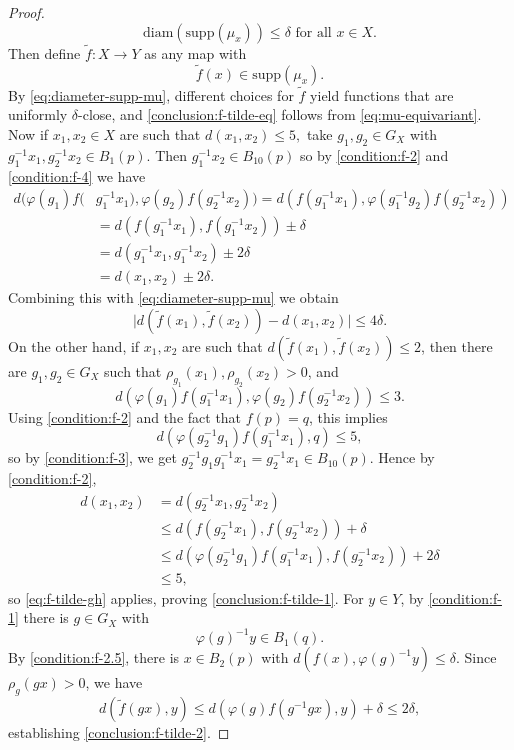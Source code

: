 \documentclass[12pt]{amsart}
\theoremstyle{definition}
\numberwithin{equation}{section}
\newcommand{\diam}{{\text {diam}}}
\newcommand{\supp}{{\text {supp}}}
\begin{document}
\begin{proof}
\begin{equation}
    \diam ( \supp (\mu _x )) \leq \delta \text{ for all }x \in X.    
    \end{equation}
    Then define $\tilde {f} : X \to Y$ as any map with
    \begin{equation}\label{eq:f-tilde-def}
    \tilde{f} (x) \in \supp (\mu _x ).  
    \end{equation}
    By \eqref{eq:diameter-supp-mu},  different choices for $\tilde{f}$ yield functions that are uniformly $\delta $-close, and \eqref{conclusion:f-tilde-eq} follows from  \eqref{eq:mu-equivariant}. Now if $x_1, x_2 \in X$ are such that  $ d( x_1, x_2 ) \leq 5,$ take  $g_1, g_2 \in G_X$ with $g^{-1}_1x_1 , g^{-1}_2x_2 \in B_1(p)$. Then $g_1^{-1} x_2 \in B_{10} (p)$ so by  \eqref{condition:f-2} and \eqref{condition:f-4} we have  
    \begin{align*}
     d( \varphi (g_1) f(&g_1^{-1} x_1) , \varphi (g_2) f(g_2^{-1}x_2)  )   =  d(   f ( g_1 ^{-1} x_1  ) , \varphi ( g_1 ^{-1}g_2  ) f(  g_2 ^{-1} x_2 )   )\\
    & =  d (  f ( g_1 ^{-1} x_1 ) , f (  g_1 ^{-1} x_2 ) ) \pm \delta \\
    & = d( g_1^{-1} x_1 , g_1^{-1}x_2 )  \pm 2 \delta \\
    & = d(x_1, x_2 ) \pm 2 \delta .
    \end{align*}
    Combining this with \eqref{eq:diameter-supp-mu} we obtain
    \begin{equation}\label{eq:f-tilde-gh}
        \vert d ( \tilde{f} (x_1) , \tilde{f} (x_2)  ) - d(x_1, x_2) \vert \leq 4 \delta .   
    \end{equation}   
    On the other hand, if $x_1, x_2$ are such that $d( \tilde{f} (x_1), \tilde{f}(x_2)) \leq 2$, then there are $g_1, g_2 \in G_X$ such that $\rho_{g_1}(x_1), \rho _{g_2 } (x_2) > 0 $, and 
    \[    d(  \varphi ( g_1 ) f(g_1^{-1}x_1)     , \varphi (g_2) f(g_2 ^{-1} x_2) ) \leq 3.                            \]
    Using \eqref{condition:f-2} and the fact that $f(p)  = q$, this implies 
    \[        d(  \varphi ( g_2^{-1}  g_1 )  f( g_1^{-1}x_1), q )  \leq 5, \]
    so by \eqref{condition:f-3}, we get $ g_2^{-1} g_1 g_1^{-1} x_1 = g_2^{-1}x_1 \in B_{10}(p)$. Hence by \eqref{condition:f-2}, 
    \begin{align*}
    d( x_1, x_2 ) & =  d ( g_2^{-1}  x_1 , g_2^{-1} x_2  ) \\
     & \leq d(  f(  g_2 ^{-1} x_1  ) , f ( g_2 ^{-1} x_2 )  )  +  \delta \\
     & \leq d(  \varphi ( g_2 ^{-1}  g_1 ) f(  g_1 ^{-1} x_1  ) , f ( g_2 ^{-1} x_2 )  )  + 2 \delta   \\
     & \leq 5,
    \end{align*}
    so  \eqref{eq:f-tilde-gh} applies, proving  \eqref{conclusion:f-tilde-1}.  For $y \in Y$, by  \eqref{condition:f-1} there is $g \in G_X$ with 
    \[ \varphi (g) ^{-1} y \in B_1(q) .\] 
    By \eqref{condition:f-2.5}, there is $x \in B_2 (p)$ with $d(f(x), \varphi (g)^{-1} y ) \leq \delta$.  Since $\rho_g(gx) > 0$, we have
    \[    d ( \tilde {f} (gx), y ) \leq d(  \varphi (g) f( g^{-1}g x   ) , y ) + \delta \leq 2 \delta , \]
  establishing  \eqref{conclusion:f-tilde-2}. 
    

\end{proof}
\end{document}
